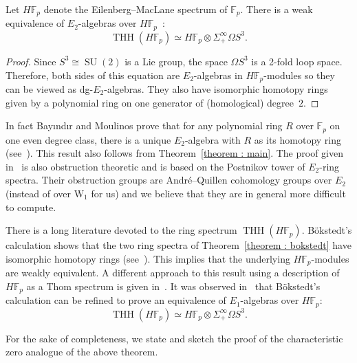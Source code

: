 \documentclass[AHL,Unicode,longabstracts,published]{cedram}
\DeclareMathOperator{\THH}{THH}
\DeclareMathOperator{\SUU}{SU}
\newcommand{\W}{\mathrm{W}}
\newcommand{\FF}{\mathbb{F}}
\newcommand{\FF}{\mathbb{F}}
\begin{document}
\begin{theo}\label{theorem : bokstedt}
Let $H\FF_p$ denote the Eilenberg--MacLane spectrum of $\FF_p$. There is a weak equivalence of $E_2$-algebras over $H\FF_p$~:
\[
\THH(H\FF_p)\simeq H\FF_p\otimes\Sigma^{\infty}_+\Omega S^3.
\]
\end{theo}

\begin{proof}
Since $S^3\cong \SUU(2)$ is a Lie group, the space $\Omega S^3$ is a 2-fold loop space. Therefore, both sides of this equation are $E_2$-algebras in $H\FF_p$-modules so they can be viewed as dg-$E_2$-algebras. They also have isomorphic homotopy rings given by a polynomial ring on one generator of (homological) degree~$2$.
\end{proof}

\begin{rema}
In fact Bayındır and Moulinos prove that for any polynomial ring $R$ over $\FF_p$ on one even degree class, there is a unique $E_2$-algebra with $R$ as its homotopy ring (see~\cite[Theorem~2.1]{bayindirmoulinos}). This result also follows from Theorem~\ref{theorem : main}. The proof given in~\cite{bayindirmoulinos} is also obstruction theoretic and is based on the Postnikov tower of $E_2$-ring spectra. Their obstruction groups are André--Quillen cohomology groups over $E_2$ (instead of over $\W_1$ for us) and we believe that they are in general more difficult to compute.
\end{rema}

\begin{rema}%
\!\!\!
There is a long literature devoted to the ring spectrum $\THH(H\FF_p)$. Bökstedt's calculation shows that the two ring spectra of Theorem~\ref{theorem : bokstedt} have isomorphic homotopy rings (see~\cite{bokstedttopological}). This implies that the underlying $H\FF_p$-modules are weakly equivalent. A different approach to this result using a description of $H\FF_p$ as a Thom spectrum is given in~\cite{blumbergtopological}. It was observed in~\cite[Theorem~1.1]{krausenikolaus} that Bökstedt's calculation can be refined to prove an equivalence of $E_1$-algebras over $H\FF_p$:
\[
\THH(H\FF_p)\simeq H\FF_p\otimes\Sigma^{\infty}_+\Omega S^3.
\]
\end{rema}

For the sake of completeness, we state and sketch the proof of the characteristic zero analogue of the above theorem.
\end{document}
